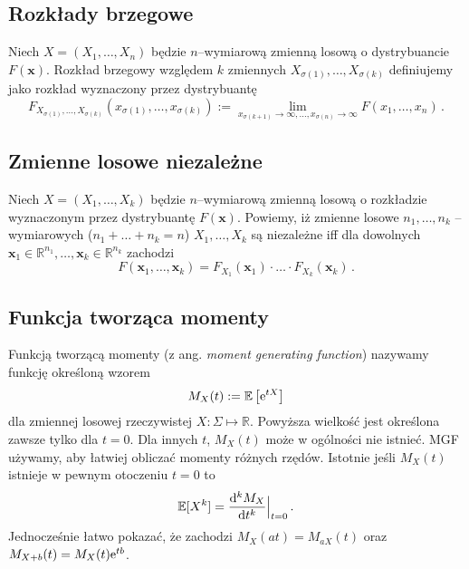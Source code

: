 \documentclass{myclass}
\begin{document}
\subsection{Rozkłady brzegowe}

Niech \(X = (X_1, \ldots, X_n)\) będzie \(n\)--wymiarową zmienną losową o dystrybuancie
\(F(\mathbf{x})\). Rozkład brzegowy względem \(k\) zmiennych \(X_{\sigma(1)},\ldots,X_{\sigma(k)}\)
definiujemy jako rozkład wyznaczony przez dystrybuantę
\begin{equation*}
    F_{X_{\sigma(1)},\ldots,X_{\sigma(k)}} (x_{\sigma(1)},\ldots,x_{\sigma(k)}) := \lim_{x_{\sigma(k+1)}\to\infty,\ldots,x_{\sigma(n)}\to\infty} F(x_1,\ldots,x_n)\,.
\end{equation*}

\subsection{Zmienne losowe niezależne}
Niech \(X = (X_1, \ldots, X_k)\) będzie \(n\)--wymiarową zmienną losową o rozkładzie wyznaczonym
przez dystrybuantę \(F(\mathbf{x})\). Powiemy, iż zmienne losowe \(n_1,\ldots,n_k\) -- wymiarowych
(\(n_1 + \ldots + n_k = n\)) \(X_1, \ldots, X_k\) są niezależne iff dla dowolnych
\(\mathbf{x}_1\in\mathbb{R}^{n_1},\ldots,\mathbf{x}_k\in\mathbb{R}^{n_k}\) zachodzi
\begin{equation*}
    F(\mathbf{x}_1,\ldots,\mathbf{x}_k) = F_{X_1}(\mathbf{x}_1)\cdot\ldots\cdot F_{X_k}(\mathbf{x}_k)\,.
\end{equation*}

\subsection{Funkcja tworząca momenty}

Funkcją tworzącą momenty (z ang. \textit{moment generating function}) nazywamy funkcję określoną
wzorem
\begin{equation*}
    M_X(t) := \mathbb{E}\left[\mathrm{e}^{t X}\right]
\end{equation*}
dla zmiennej losowej rzeczywistej \(X: \Sigma \mapsto \mathbb{R}\). Powyższa wielkość jest określona
zawsze tylko dla \(t=0\). Dla innych \(t\), \(M_X(t)\) może w ogólności nie istnieć. MGF używamy,
aby łatwiej obliczać momenty różnych rzędów. Istotnie jeśli \(M_X(t)\) istnieje w pewnym otoczeniu
\(t=0\) to
\begin{equation*}
    \mathbb{E}[X^k] = \dv[k]{M_X}{t}\Big|_{t=0}\,.
\end{equation*}
Jednocześnie łatwo pokazać, że zachodzi \(M_X(at) = M_{aX}(t)\) oraz \(M_{X+b}(t) = M_X(t)\mathrm{e}^{tb}\).
\end{document}
